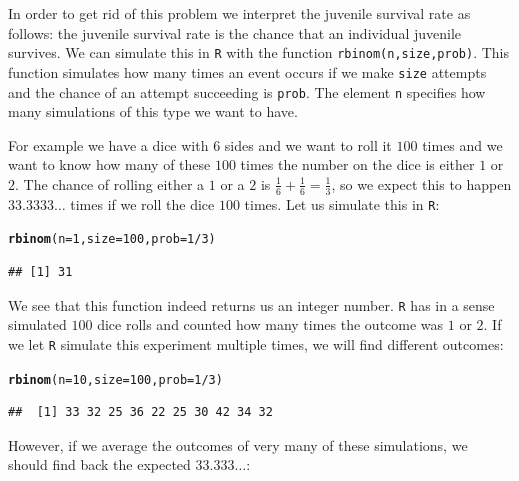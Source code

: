 \documentclass{article}\usepackage[]{graphicx}\usepackage[]{color}
\makeatletter
\newcommand{\hlnum}[1]{\textcolor[rgb]{0.686,0.059,0.569}{#1}}%
\newcommand{\hlopt}[1]{\textcolor[rgb]{0,0,0}{#1}}%
\newcommand{\hlstd}[1]{\textcolor[rgb]{0.345,0.345,0.345}{#1}}%
\newcommand{\hlkwc}[1]{\textcolor[rgb]{0.333,0.667,0.333}{#1}}%
\newcommand{\hlkwd}[1]{\textcolor[rgb]{0.737,0.353,0.396}{\textbf{#1}}}%
\newenvironment{kframe}{%
 \def\at@end@of@kframe{}%
 \ifinner\ifhmode%
  \def\at@end@of@kframe{\end{minipage}}%
  \begin{minipage}{\columnwidth}%
 \fi\fi%
 \def\FrameCommand##1{\hskip\@totalleftmargin \hskip-\fboxsep
 \colorbox{shadecolor}{##1}\hskip-\fboxsep
     \hskip-\linewidth \hskip-\@totalleftmargin \hskip\columnwidth}%
 \MakeFramed {\advance\hsize-\width
   \@totalleftmargin\z@ \linewidth\hsize
   \@setminipage}}%
 {\par\unskip\endMakeFramed%
 \at@end@of@kframe}
\newenvironment{knitrout}{}{} %
\makeatother
\begin{document}
In order to get rid of this problem we interpret the juvenile survival rate as follows: the juvenile survival rate is the chance that an individual juvenile survives. We can simulate this in \texttt{R} with the function \texttt{rbinom(n,size,prob)}. This function simulates how many times an event occurs if we make \texttt{size} attempts and the chance of an attempt succeeding is \texttt{prob}. The element \texttt{n} specifies how many simulations of this type we want to have.

For example we have a dice with 6 sides and we want to roll it $100$ times and we want to know how many of these $100$ times the number on the dice is either $1$ or $2$. The chance of rolling either a $1$ or a $2$ is $\frac{1}{6}+\frac{1}{6}=\frac{1}{3}$, so we expect this to happen $33.3333\dots$ times if we roll the dice $100$ times. Let us simulate this in \texttt{R}:
\begin{knitrout}
\color{fgcolor}\begin{kframe}
\begin{alltt}
\hlkwd{rbinom}\hlstd{(}\hlkwc{n}\hlstd{=}\hlnum{1}\hlstd{,}\hlkwc{size}\hlstd{=}\hlnum{100}\hlstd{,}\hlkwc{prob}\hlstd{=}\hlnum{1}\hlopt{/}\hlnum{3}\hlstd{)}
\end{alltt}
\begin{verbatim}
## [1] 31
\end{verbatim}
\end{kframe}
\end{knitrout}
We see that this function indeed returns us an integer number. \texttt{R} has in a sense simulated $100$ dice rolls and counted how many times the outcome was $1$ or $2$. If we let \texttt{R} simulate this experiment multiple times, we will find different outcomes:
\begin{knitrout}
\color{fgcolor}\begin{kframe}
\begin{alltt}
\hlkwd{rbinom}\hlstd{(}\hlkwc{n}\hlstd{=}\hlnum{10}\hlstd{,}\hlkwc{size}\hlstd{=}\hlnum{100}\hlstd{,}\hlkwc{prob}\hlstd{=}\hlnum{1}\hlopt{/}\hlnum{3}\hlstd{)}
\end{alltt}
\begin{verbatim}
##  [1] 33 32 25 36 22 25 30 42 34 32
\end{verbatim}
\end{kframe}
\end{knitrout}
However, if we average the outcomes of very many of these simulations, we should find back the expected $33.333\dots$:
\end{document}
